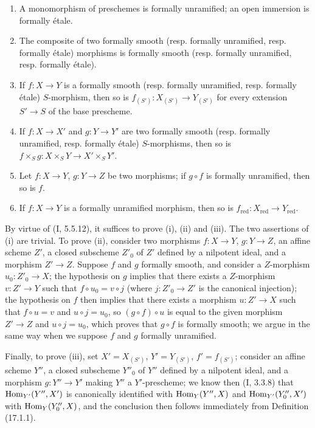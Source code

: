 \begin{proposition}[17.1.3]
\label{IV.17.1.3}
\begin{enumerate}
  \item[(i)] A monomorphism of preschemes is formally unramified; an open immersion is formally étale.
  \item[(ii)] The composite of two formally smooth (resp. formally unramified, resp. formally étale) morphisms is formally smooth (resp. formally unramified, resp. formally étale).
  \item[(iii)] If $f:X\to Y$ is a formally smooth (resp. formally unramified, resp. formally étale) $S$-morphism, then so is $f_{(S')}:X_{(S')}\to Y_{(S')}$ for every extension $S'\to S$ of the base prescheme.
  \item[(iv)] If $f:X\to X'$ and $g:Y\to Y'$ are two formally smooth (resp. formally unramified, resp. formally étale) $S$-morphisms, then so is $f\times_S g:X\times_S Y\to X'\times_S Y'$.
  \item[(v)] Let $f:X\to Y$, $g:Y\to Z$ be two morphisms; if $g\circ f$ is formally unramified, then so is $f$.
  \item[(vi)] If $f:X\to Y$ is a formally unramified morphism, then so is $f_{\mathrm{red}}:X_{\mathrm{red}}\to Y_{\mathrm{red}}$.
\end{enumerate}
\end{proposition}

By virtue of (I, 5.5.12), it suffices to prove (i), (ii) and (iii). The two assertions of (i) are trivial. To prove (ii), consider two morphisms $f:X\to Y$, $g:Y\to Z$, an affine scheme $Z'$, a closed subscheme $Z'_0$ of $Z'$ defined by a nilpotent ideal, and a morphism $Z'\to Z$. Suppose $f$ and $g$ formally smooth, and consider a
$Z$-morphism $u_0:Z'_0\to X$; the hypothesis on $g$ implies that there exists a $Z$-morphism $v:Z'\to Y$ such that $f\circ u_0=v\circ j$ (where $j:Z'_0\to Z'$ is the canonical injection); the hypothesis on $f$ then implies that there exists a morphism $u:Z'\to X$ such that $f\circ u=v$ and $u\circ j=u_0$, so $(g\circ f)\circ u$ is equal to the given morphism $Z'\to Z$ and $u\circ j=u_0$, which proves that $g\circ f$ is formally smooth; we argue in the same way when we suppose $f$ and $g$ formally unramified.

Finally, to prove (iii), set $X'=X_{(S')}$, $Y'=Y_{(S')}$, $f'=f_{(S')}$; consider an affine scheme $Y''$, a closed subscheme $Y''_0$ of $Y''$ defined by a nilpotent ideal, and a morphism $g:Y''\to Y'$ making $Y''$ a $Y'$-prescheme; we know then (I, 3.3.8) that $\operatorname{Hom}_{Y'}(Y'',X')$ is canonically identified with $\operatorname{Hom}_Y(Y'',X)$ and $\operatorname{Hom}_{Y'}(Y''_0,X')$ with $\operatorname{Hom}_Y(Y''_0,X)$, and the conclusion then follows immediately from Definition (17.1.1).

